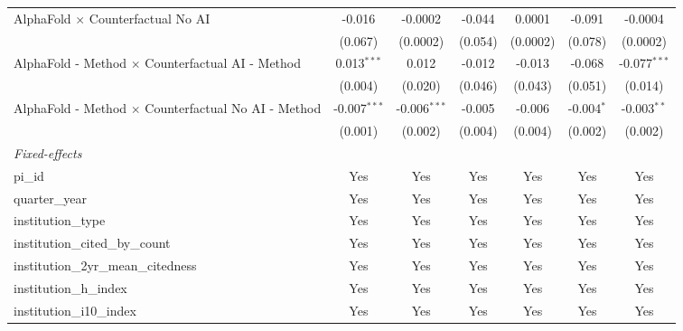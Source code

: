 \begin{tabular}{lcccccc}
   AlphaFold $\times$ Counterfactual No AI                     & -0.016         & -0.0002        & -0.044        & 0.0001        & -0.091        & -0.0004\\   
                                                               & (0.067)        & (0.0002)       & (0.054)       & (0.0002)      & (0.078)       & (0.0002)\\   
   AlphaFold - Method $\times$ Counterfactual AI - Method      & 0.013$^{***}$  & 0.012          & -0.012        & -0.013        & -0.068        & -0.077$^{***}$\\   
                                                               & (0.004)        & (0.020)        & (0.046)       & (0.043)       & (0.051)       & (0.014)\\   
   AlphaFold - Method $\times$ Counterfactual No AI - Method   & -0.007$^{***}$ & -0.006$^{***}$ & -0.005        & -0.006        & -0.004$^{*}$  & -0.003$^{**}$\\   
                                                               & (0.001)        & (0.002)        & (0.004)       & (0.004)       & (0.002)       & (0.002)\\   
   \midrule
   \emph{Fixed-effects}\\
   pi\_id                                                      & Yes            & Yes            & Yes           & Yes           & Yes           & Yes\\  
   quarter\_year                                               & Yes            & Yes            & Yes           & Yes           & Yes           & Yes\\  
   institution\_type                                           & Yes            & Yes            & Yes           & Yes           & Yes           & Yes\\  
   institution\_cited\_by\_count                               & Yes            & Yes            & Yes           & Yes           & Yes           & Yes\\  
   institution\_2yr\_mean\_citedness                           & Yes            & Yes            & Yes           & Yes           & Yes           & Yes\\  
   institution\_h\_index                                       & Yes            & Yes            & Yes           & Yes           & Yes           & Yes\\  
   institution\_i10\_index                                     & Yes            & Yes            & Yes           & Yes           & Yes           & Yes\\  

\end{tabular}
